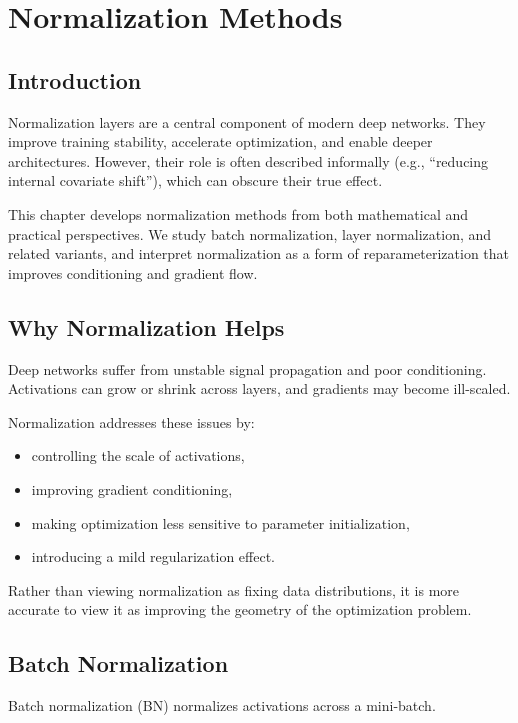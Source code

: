 \chapter{Normalization Methods}

\section{Introduction}

Normalization layers are a central component of modern deep networks. They improve training stability, accelerate optimization, and enable deeper architectures. However, their role is often described informally (e.g., ``reducing internal covariate shift''), which can obscure their true effect.

This chapter develops normalization methods from both mathematical and practical perspectives. We study batch normalization, layer normalization, and related variants, and interpret normalization as a form of reparameterization that improves conditioning and gradient flow.

\section{Why Normalization Helps}

Deep networks suffer from unstable signal propagation and poor conditioning. Activations can grow or shrink across layers, and gradients may become ill-scaled.

Normalization addresses these issues by:
\begin{itemize}
    \item controlling the scale of activations,
    \item improving gradient conditioning,
    \item making optimization less sensitive to parameter initialization,
    \item introducing a mild regularization effect.
\end{itemize}

Rather than viewing normalization as fixing data distributions, it is more accurate to view it as improving the geometry of the optimization problem.

\section{Batch Normalization}

Batch normalization (BN) normalizes activations across a mini-batch.

